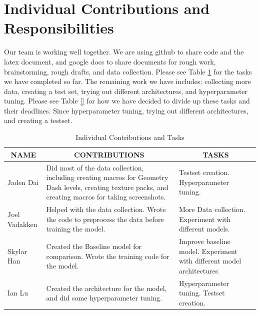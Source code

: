 \documentclass{article} %
\begin{document}
\section{Individual Contributions and Responsibilities}
\label{gen_inst}

Our team is working well together. We are using github to share code and the latex document, and google docs to share documents for rough work, brainstorming, rough drafts, and data collection. Please see Table \ref{table:contributions} for the tasks we have completed so far. The remaining work we have includes: collecting more data, creating a test set, trying out different architectures, and hyperparameter tuning.  Please see Table \ref{} for how we have decided to divide up these tasks and their deadlines. Since hyperparameter tuning, trying out different architectures, and creating a testset. 

\begin{table}[h]
\caption{Individual Contributions and Tasks}
\label{table:contributions}
\begin{center}
\begin{tabular}{|p{2cm}|p{6cm}|p{6cm}|}
\hline
\multicolumn{1}{|c|}{\bf NAME} & \multicolumn{1}{c|}{\bf CONTRIBUTIONS} & \multicolumn{1}{c|}{\bf TASKS}\\ \hline
Jaden Dai & Did most of the data collection, including creating macros for Geometry Dash levels, creating texture packs, and creating macros for taking screenshots. & Testset creation. Hyperparameter tuning.\\ \hline
Joel Vadakken & Helped with the data collection. Wrote the code to preprocess the data before training the model. & More Data collection. Experiment with different models.\\ \hline
Skylar Han & Created the Baseline model for comparison. Wrote the training code for the model. & Improve baseline model. Experiment with different model architectures\\ \hline 
Ian Lu & Created the architecture for the model, and did some hyperparameter tuning. & Hyperparameter tuning. Testset creation. \\ \hline
\end{tabular}
\end{center}
\end{table}
\end{document}
